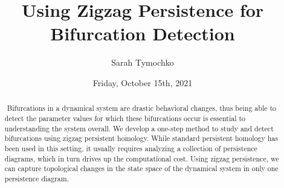 \documentclass{UAmathtalk}
\author{Sarah Tymochko}
\title{Using Zigzag Persistence for Bifurcation Detection}
\date{Friday, October 15th, 2021}
\begin{document}
\maketitle

%

\begin{abstract} Bifurcations in a dynamical system are drastic behavioral changes, thus being able to detect the parameter values for which these bifurcations occur is essential to understanding the system overall. We develop a one-step method to study and detect bifurcations using zigzag persistent homology. While standard persistent homology has been used in this setting, it usually requires analyzing a collection of persistence diagrams, which in turn drives up the computational cost. Using zigzag persistence, we can capture topological changes in the state space of the dynamical system in only one persistence diagram.
\end{abstract}
\end{document}
